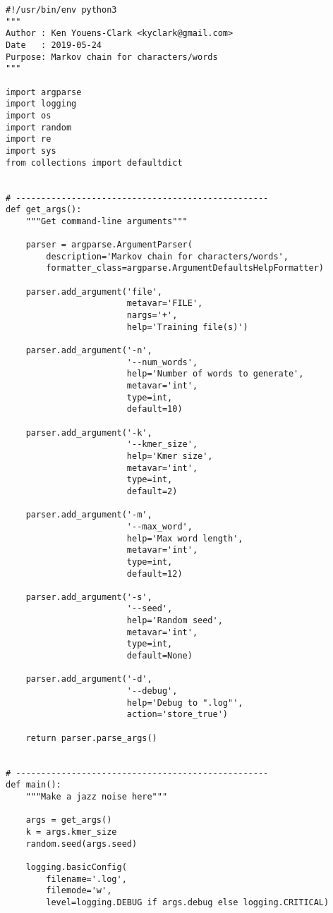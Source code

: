 \documentclass[]{article}
\begin{document}
\begin{verbatim}
#!/usr/bin/env python3
"""
Author : Ken Youens-Clark <kyclark@gmail.com>
Date   : 2019-05-24
Purpose: Markov chain for characters/words
"""

import argparse
import logging
import os
import random
import re
import sys
from collections import defaultdict


# --------------------------------------------------
def get_args():
    """Get command-line arguments"""

    parser = argparse.ArgumentParser(
        description='Markov chain for characters/words',
        formatter_class=argparse.ArgumentDefaultsHelpFormatter)

    parser.add_argument('file',
                        metavar='FILE',
                        nargs='+',
                        help='Training file(s)')

    parser.add_argument('-n',
                        '--num_words',
                        help='Number of words to generate',
                        metavar='int',
                        type=int,
                        default=10)

    parser.add_argument('-k',
                        '--kmer_size',
                        help='Kmer size',
                        metavar='int',
                        type=int,
                        default=2)

    parser.add_argument('-m',
                        '--max_word',
                        help='Max word length',
                        metavar='int',
                        type=int,
                        default=12)

    parser.add_argument('-s',
                        '--seed',
                        help='Random seed',
                        metavar='int',
                        type=int,
                        default=None)

    parser.add_argument('-d',
                        '--debug',
                        help='Debug to ".log"',
                        action='store_true')

    return parser.parse_args()


# --------------------------------------------------
def main():
    """Make a jazz noise here"""

    args = get_args()
    k = args.kmer_size
    random.seed(args.seed)

    logging.basicConfig(
        filename='.log',
        filemode='w',
        level=logging.DEBUG if args.debug else logging.CRITICAL)


\end{verbatim}
\end{document}
